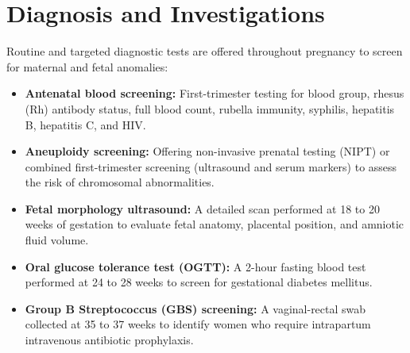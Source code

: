 \section*{Diagnosis and Investigations}
Routine and targeted diagnostic tests are offered throughout pregnancy to screen for maternal and fetal anomalies:
\begin{itemize}
    \item \textbf{Antenatal blood screening:} First-trimester testing for blood group, rhesus (Rh) antibody status, full blood count, rubella immunity, syphilis, hepatitis B, hepatitis C, and HIV.
    \item \textbf{Aneuploidy screening:} Offering non-invasive prenatal testing (NIPT) or combined first-trimester screening (ultrasound and serum markers) to assess the risk of chromosomal abnormalities.
    \item \textbf{Fetal morphology ultrasound:} A detailed scan performed at 18 to 20 weeks of gestation to evaluate fetal anatomy, placental position, and amniotic fluid volume.
    \item \textbf{Oral glucose tolerance test (OGTT):} A 2-hour fasting blood test performed at 24 to 28 weeks to screen for gestational diabetes mellitus.
    \item \textbf{Group B Streptococcus (GBS) screening:} A vaginal-rectal swab collected at 35 to 37 weeks to identify women who require intrapartum intravenous antibiotic prophylaxis.
\end{itemize}

